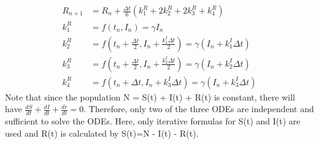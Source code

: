 \documentclass[a4paper]{article}
\begin{document}
        \begin{equation}\label{RK4-SIR-3}
            \begin{split}
                R_{n+1} & = R_n + \frac{\Delta t}{6}(k_1^R + 2k_2^R + 2k_3^R + k_4^R) \\
                k_1^R & = f(t_n, I_n) = \gamma I_n \\
                k_2^R & = f(t_n + \frac{\Delta t}{2}, I_n + \frac{k_1^I \Delta t}{2}) = \gamma (I_n + k_1^I \Delta t)  \\
                k_3^R & = f(t_n + \frac{\Delta t}{2}, I_n + \frac{k_2^I \Delta t}{2}) = \gamma (I_n + k_2^I \Delta t)  \\
                k_4^R & = f(t_n + \Delta t, I_n + k_3^I \Delta t) = \gamma (I_n + k_3^I \Delta t)
            \end{split}
        \end{equation}
        \indent Note that since the population N = S(t) + I(t) + R(t) is constant, there will have $\frac{dS}{dt} + \frac{dI}{dt} + \frac{dr}{dt} = 0$. Therefore, only two of the three ODEs are independent and sufficient to solve the ODEs. Here, only iterative formulas for S(t) and I(t) are used and R(t) is calculated by S(t)=N - I(t) - R(t).
        
        
\end{document}
